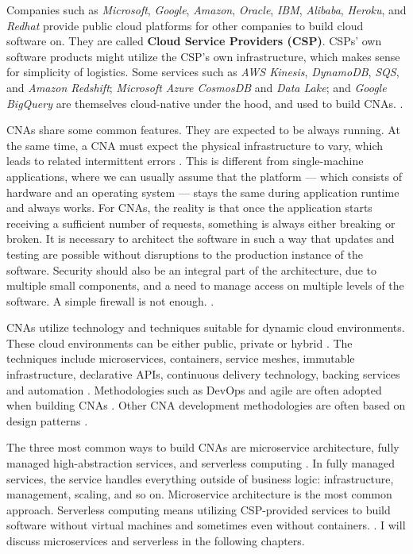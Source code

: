 \documentclass[utf8,english]{gradu3}
\begin{document}
Companies such as \textit{Microsoft}, \textit{Google}, \textit{Amazon},
\textit{Oracle}, \textit{IBM}, \textit{Alibaba}, \textit{Heroku}, and
\textit{Redhat} provide public cloud platforms for other companies to build
cloud software on. They are called \textbf{Cloud Service Providers (CSP)}. CSPs'
own software products might utilize the CSP's own infrastructure, which makes
sense for simplicity of logistics. Some services such as \textit{AWS Kinesis},
\textit{DynamoDB}, \textit{SQS}, and \textit{Amazon Redshift}; \textit{Microsoft
  Azure CosmosDB} and \textit{Data Lake}; and \textit{Google BigQuery} are
themselves cloud-native under the hood, and used to build CNAs.
\parencite[17]{Gannon2017}.

CNAs share some common features. They are expected to be always running. At the
same time, a CNA must expect the physical infrastructure to vary, which leads to
related intermittent errors \parencite[17]{Gannon2017}. This is different from
single-machine applications, where we can usually assume that the platform —
which consists of hardware and an operating system --- stays the same during
application runtime and always works. For CNAs, the reality is that once the
application starts receiving a sufficient number of requests, something is
always either breaking or broken. It is necessary to architect the software in
such a way that updates and testing are possible without disruptions to the
production instance of the software. Security should also be an integral part of
the architecture, due to multiple small components, and a need to manage access
on multiple levels of the software. A simple firewall is not enough.
\parencite[17]{Gannon2017}.

CNAs utilize technology and techniques suitable for dynamic cloud environments.
These cloud environments can be either public, private or hybrid
\parencite{CNAF2018}. The techniques include microservices, containers, service
meshes, immutable infrastructure, declarative APIs, continuous delivery
technology, backing services and automation \parencite{CNAF2018, Patrizio2018,
  Microsoft2022-CNA}. Methodologies such as DevOps and agile are often adopted when
building CNAs \parencite{Patrizio2018}. Other CNA development methodologies are
often based on design patterns \parencite{Kratzke2017}.

The three most common ways to build CNAs are microservice architecture, fully
managed high-abstraction services, and serverless computing
\parencite[17]{Gannon2017}. In fully managed services, the service handles
everything outside of business logic: infrastructure, management, scaling, and
so on. Microservice architecture is the most common approach. Serverless
computing means utilizing CSP-provided services to build software without
virtual machines and sometimes even without containers.
\parencite[17]{Gannon2017}. I will discuss microservices and serverless in the
following chapters.
\end{document}
